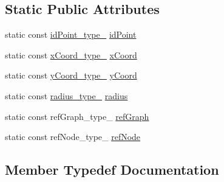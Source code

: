 \subsection*{Static Public Attributes}
\begin{DoxyCompactItemize}
\item 
static const \hyperlink{structodb_1_1query__columns_3_01_1_1_point_00_01id__pgsql_00_01_a_01_4_a1b73c11154d6a12b3bda33b0362e1cbd}{id\+Point\+\_\+type\+\_\+} \hyperlink{structodb_1_1query__columns_3_01_1_1_point_00_01id__pgsql_00_01_a_01_4_ac40ef5740dd441d21985f09d99b04d85}{id\+Point}
\item 
static const \hyperlink{structodb_1_1query__columns_3_01_1_1_point_00_01id__pgsql_00_01_a_01_4_a2410ebc7698f7395087c9cf262e74e67}{x\+Coord\+\_\+type\+\_\+} \hyperlink{structodb_1_1query__columns_3_01_1_1_point_00_01id__pgsql_00_01_a_01_4_a800b6844444c836a892f35f9b38b5051}{x\+Coord}
\item 
static const \hyperlink{structodb_1_1query__columns_3_01_1_1_point_00_01id__pgsql_00_01_a_01_4_a63554286768ef21f26b9034334df7a25}{y\+Coord\+\_\+type\+\_\+} \hyperlink{structodb_1_1query__columns_3_01_1_1_point_00_01id__pgsql_00_01_a_01_4_a97e8b4a26242a5e4515a13854ac6979d}{y\+Coord}
\item 
static const \hyperlink{structodb_1_1query__columns_3_01_1_1_point_00_01id__pgsql_00_01_a_01_4_a920c99ed9235ee77ecae8f3de56c88b5}{radius\+\_\+type\+\_\+} \hyperlink{structodb_1_1query__columns_3_01_1_1_point_00_01id__pgsql_00_01_a_01_4_a03c4735e1ec94c67c4f6076806ecaac6}{radius}
\item 
static const ref\+Graph\+\_\+type\+\_\+ \hyperlink{structodb_1_1query__columns_3_01_1_1_point_00_01id__pgsql_00_01_a_01_4_aee5faf1228139083232ecefbab3f1753}{ref\+Graph}
\item 
static const ref\+Node\+\_\+type\+\_\+ \hyperlink{structodb_1_1query__columns_3_01_1_1_point_00_01id__pgsql_00_01_a_01_4_ac4887031a91c31299df7bbd5c2fcc82b}{ref\+Node}
\end{DoxyCompactItemize}


\subsection{Member Typedef Documentation}
\hypertarget{structodb_1_1query__columns_3_01_1_1_point_00_01id__pgsql_00_01_a_01_4_a1b73c11154d6a12b3bda33b0362e1cbd}{}
